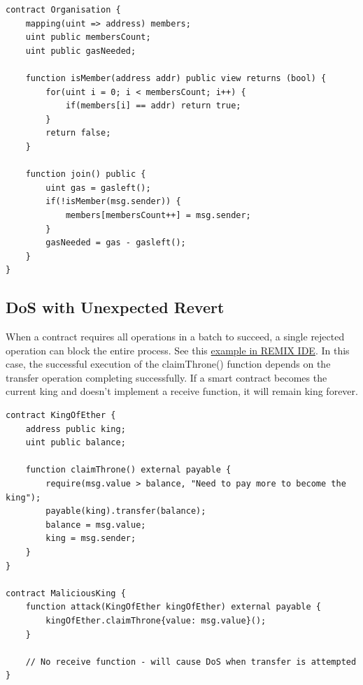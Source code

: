 \documentclass[12pt]{article}
\begin{document}
\noindent
\begin{minipage}{\textwidth}
\begin{lstlisting}[language=Solidity, caption=DoS with Block Gas Limit Example]
contract Organisation {
    mapping(uint => address) members;
    uint public membersCount;
    uint public gasNeeded;

    function isMember(address addr) public view returns (bool) {
        for(uint i = 0; i < membersCount; i++) {
            if(members[i] == addr) return true;
        }
        return false;
    }

    function join() public {
        uint gas = gasleft();
        if(!isMember(msg.sender)) {
            members[membersCount++] = msg.sender;
        }
        gasNeeded = gas - gasleft();
    }
}
\end{lstlisting}
\end{minipage}

\subsection{DoS with Unexpected Revert}

When a contract requires all operations in a batch to succeed, a single rejected operation can block the entire process. See this \href{https://remix.ethereum.org/?#activate=solidity&url=https://github.com/radovluk/unbreakable-vault/contracts/DoS02.sol&lang=en&optimize=false&runs=200&evmVersion=null&version=soljson-v0.8.28+commit.7893614a.js}{example in REMIX IDE}. In this case, the successful execution of the claimThrone() function depends on the transfer operation completing successfully. If a smart contract becomes the current king and doesn't implement a receive function, it will remain king forever.

\noindent
\begin{minipage}{\textwidth}
\begin{lstlisting}[language=Solidity, caption=DoS with Revert Example]
contract KingOfEther {
    address public king;
    uint public balance;

    function claimThrone() external payable {
        require(msg.value > balance, "Need to pay more to become the king");
        payable(king).transfer(balance);
        balance = msg.value;
        king = msg.sender;
    }
}

contract MaliciousKing {    
    function attack(KingOfEther kingOfEther) external payable {
        kingOfEther.claimThrone{value: msg.value}();
    }

    // No receive function - will cause DoS when transfer is attempted
}
\end{lstlisting}
\end{minipage}
\end{document}
